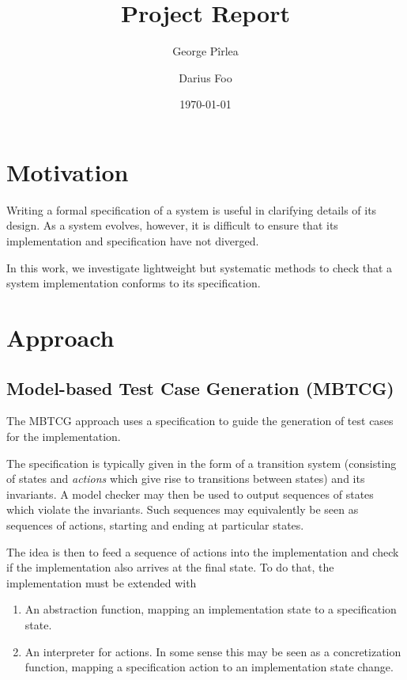 \documentclass[a4paper]{article}
\title{Project Report}
\author{George Pîrlea \and Darius Foo}
\date{\today}
\begin{document}
\maketitle

\section{Motivation}

Writing a formal specification of a system is useful in clarifying details of its design. As a system evolves, however, it is difficult to ensure that its implementation and specification have not diverged.

In this work, we investigate lightweight but systematic methods to check that a system implementation conforms to its specification.

\section{Approach}

\subsection{Model-based Test Case Generation (MBTCG)}

The MBTCG approach uses a specification to guide the generation of test cases for the implementation.

The specification is typically given in the form of a transition system (consisting of states and \emph{actions} which give rise to transitions between states) and its invariants. A model checker may then be used to output sequences of states which violate the invariants. Such sequences may equivalently be seen as sequences of actions, starting and ending at particular states.

The idea is then to feed a sequence of actions into the implementation and check if the implementation also arrives at the final state. To do that, the implementation must be extended with

\begin{enumerate}
\item An abstraction function, mapping an implementation state to a specification state.
\item An interpreter for actions. In some sense this may be seen as a concretization function, mapping a specification action to an implementation state change.
\end{enumerate}
\end{document}

